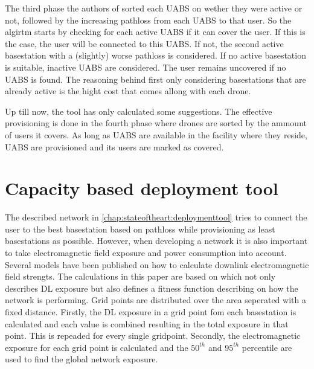 The third phase the authors of \cite{J2} sorted each \gls{UABS} on wether they were active or not, followed by the increasing pathloss from each \gls{UABS} to that user.
So the algirtm starts by checking for each active \gls{UABS} if it can cover the user. If this is the case, the user will be connected to this \gls{UABS}. If not,
the second active basestation with a (slightly) worse pathloss is considered. If no active basestation is suitable, inactive \gls{UABS} are considered. The user remains uncovered if no \gls{UABS}
is found. The reasoning behind first only considering basestations that are already active is the hight cost that comes allong with each drone.

Up till now, the tool has only calculated some suggestions. The effective provisioning is done in the fourth phase where drones are sorted by the ammount of users it covers. As long as \gls{UABS}
are available in the facility where they reside, \gls{UABS} are provisioned and its users are marked as covered.


\section{Capacity based deployment tool}
\label{chap:capbaseddeploymenttool}

The described network in \ref{chap:stateoftheart:deploymenttool} tries to connect the user to the best basestation based on pathloss while provisioning as least basestations as possible.
However, when developing a network it is also important to take electromagnetic field exposure and power consumption into account. Several models have been published on how to calculate downlink electromagnetic field strengts. 
The calculations in this paper are based on \cite{J1} which not only describes \gls{DL} exposure but also defines a fitness function describing on how the network is performing. 
Grid points are distributed over the area seperated with a fixed distance. Firstly, the \gls{DL} exposure in a grid point fom each basestation is calculated and each value is combined resulting
in the total exposure in that point. This is repeaded for every single gridpoint.
Secondly, the electromagnetic exposure for each grid point is calculated and the $50^{th}$ and $95^{th}$ percentile are used to find the global network exposure. \\

